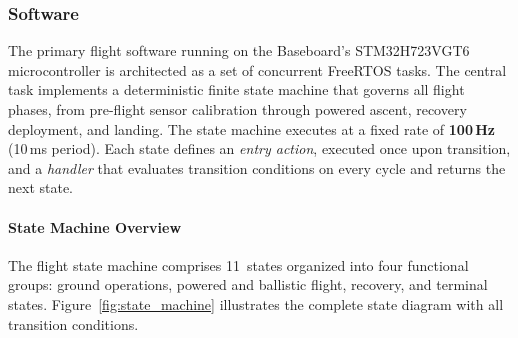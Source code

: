 
\newcommand{\cfg}[1]{\texttt{\seqsplit{#1}}}

\subsubsection{Software}
\label{subsubsection:software}

The primary flight software running on the Baseboard's STM32H723VGT6 microcontroller is architected as a set of concurrent FreeRTOS tasks. The central task implements a deterministic finite state machine that governs all flight phases, from pre-flight sensor calibration through powered ascent, recovery deployment, and landing. The state machine executes at a fixed rate of \textbf{100\,Hz} (10\,ms period). Each state defines an \emph{entry action}, executed once upon transition, and a \emph{handler} that evaluates transition conditions on every cycle and returns the next state.

\paragraph{State Machine Overview}

The flight state machine comprises 11~states organized into four functional groups: ground operations, powered and ballistic flight, recovery, and terminal states. Figure~\ref{fig:state_machine} illustrates the complete state diagram with all transition conditions.

